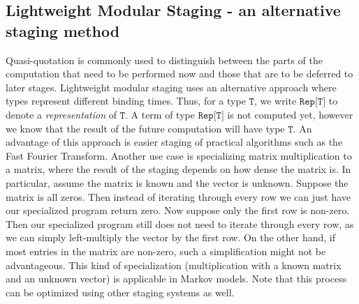\documentclass[11pt]{article}
\theoremstyle{definition}
\newcommand{\code}[1]{\texttt{#1}}
\newcommand\tab[1][1cm]{\hspace*{#1}}
\begin{document}
\subsection{Lightweight Modular Staging - an alternative staging method}
\tab Quasi-quotation is commonly used to distinguish between the parts of the computation that need to be performed now and those that are to be deferred to later stages.
Lightweight modular staging \cite{rompf2012lightweight}  uses an alternative approach where types represent different binding times. Thus, for a type $\code{T}$, we write $\texttt{Rep[T]}$ to denote a \textit{representation} of $\code{T}$. A term of type $\texttt{Rep[T]}$ is not computed yet, however we know that the result of the future computation
will have type $\code{T}$. An advantage of this approach is easier staging of practical algorithms such as the Fast Fourier Transform. \newline
\tab Another use case is specializing matrix multiplication to a matrix, where the result of the staging depends on how dense the matrix is. In particular, assume the matrix is known and the vector is unknown. Suppose the matrix is all zeros. Then instead of iterating through every row we can just have our specialized program return zero. Now suppose only the first row is non-zero. Then our specialized program still does not need to iterate through every row, as we can simply left-multiply the vector by the first row. On the other hand, if most entries in the matrix are non-zero, such a simplification might not be advantageous. This kind of specialization (multiplication with a known matrix and an unknown vector) is applicable in Markov models. Note that this process can be optimized using other staging systems as well. 
\end{document}
